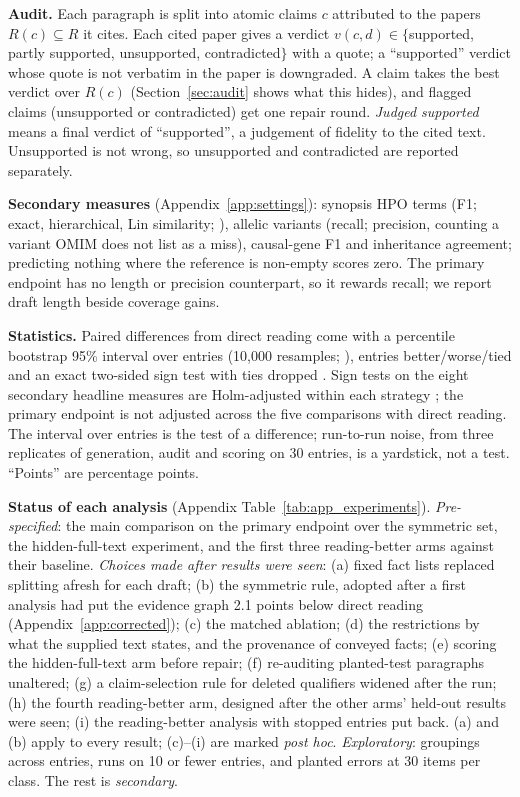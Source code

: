 \documentclass{article} %
\begin{document}
\textbf{Audit.} Each paragraph is split into atomic claims $c$ attributed to the papers $R(c)\subseteq R$ it cites. Each cited paper gives a verdict $v(c,d)\in\{$supported, partly supported, unsupported, contradicted$\}$ with a quote; a ``supported'' verdict whose quote is not verbatim in the paper is downgraded. A claim takes the best verdict over $R(c)$ (Section~\ref{sec:audit} shows what this hides), and flagged claims (unsupported or contradicted) get one repair round. \emph{Judged supported} means a final verdict of ``supported'', a judgement of fidelity to the cited text. Unsupported is not wrong, so unsupported and contradicted are reported separately.

\textbf{Secondary measures} (Appendix~\ref{app:settings}): synopsis HPO terms (F1; exact, hierarchical, Lin similarity; \citealp{Khler2009ClinicalDiagnostics,Resnik1995UsingInformation}), allelic variants (recall; precision, counting a variant OMIM does not list as a miss), causal-gene F1 and inheritance agreement; predicting nothing where the reference is non-empty scores zero. The primary endpoint has no length or precision counterpart, so it rewards recall; we report draft length beside coverage gains.

\textbf{Statistics.} Paired differences from direct reading come with a percentile bootstrap 95\% interval over entries (10,000 resamples; \citealp{Efron1979BootstrapMethods}), entries better/worse/tied and an exact two-sided sign test with ties dropped \citep{Dixon1946StatisticalSign}. Sign tests on the eight secondary headline measures are Holm-adjusted within each strategy \citep{holm1979simple}; the primary endpoint is not adjusted across the five comparisons with direct reading. The interval over entries is the test of a difference; run-to-run noise, from three replicates of generation, audit and scoring on 30 entries, is a yardstick, not a test. ``Points'' are percentage points.

\textbf{Status of each analysis} (Appendix Table~\ref{tab:app_experiments}). \emph{Pre-specified}: the main comparison on the primary endpoint over the symmetric set, the hidden-full-text experiment, and the first three reading-better arms against their baseline. \emph{Choices made after results were seen}: (a) fixed fact lists replaced splitting afresh for each draft; (b) the symmetric rule, adopted after a first analysis had put the evidence graph 2.1 points below direct reading (Appendix~\ref{app:corrected}); (c) the matched ablation; (d) the restrictions by what the supplied text states, and the provenance of conveyed facts; (e) scoring the hidden-full-text arm before repair; (f) re-auditing planted-test paragraphs unaltered; (g) a claim-selection rule for deleted qualifiers widened after the run; (h) the fourth reading-better arm, designed after the other arms' held-out results were seen; (i) the reading-better analysis with stopped entries put back. (a) and (b) apply to every result; (c)--(i) are marked \emph{post hoc}. \emph{Exploratory}: groupings across entries, runs on 10 or fewer entries, and planted errors at 30 items per class. The rest is \emph{secondary}.
\end{document}

